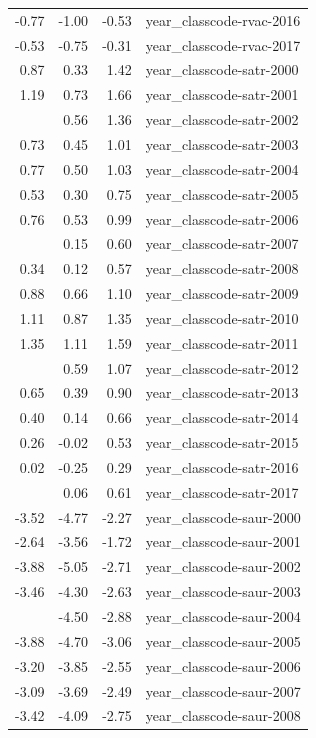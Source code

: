 \documentclass[]{article}
\begin{document}
\begin{longtable}[t]{rrrl}
-0.77 & -1.00 & -0.53 & year\_classcode-rvac-2016\\
-0.53 & -0.75 & -0.31 & year\_classcode-rvac-2017\\
0.87 & 0.33 & 1.42 & year\_classcode-satr-2000\\
1.19 & 0.73 & 1.66 & year\_classcode-satr-2001\\
\addlinespace
0.96 & 0.56 & 1.36 & year\_classcode-satr-2002\\
0.73 & 0.45 & 1.01 & year\_classcode-satr-2003\\
0.77 & 0.50 & 1.03 & year\_classcode-satr-2004\\
0.53 & 0.30 & 0.75 & year\_classcode-satr-2005\\
0.76 & 0.53 & 0.99 & year\_classcode-satr-2006\\
\addlinespace
0.38 & 0.15 & 0.60 & year\_classcode-satr-2007\\
0.34 & 0.12 & 0.57 & year\_classcode-satr-2008\\
0.88 & 0.66 & 1.10 & year\_classcode-satr-2009\\
1.11 & 0.87 & 1.35 & year\_classcode-satr-2010\\
1.35 & 1.11 & 1.59 & year\_classcode-satr-2011\\
\addlinespace
0.83 & 0.59 & 1.07 & year\_classcode-satr-2012\\
0.65 & 0.39 & 0.90 & year\_classcode-satr-2013\\
0.40 & 0.14 & 0.66 & year\_classcode-satr-2014\\
0.26 & -0.02 & 0.53 & year\_classcode-satr-2015\\
0.02 & -0.25 & 0.29 & year\_classcode-satr-2016\\
\addlinespace
0.33 & 0.06 & 0.61 & year\_classcode-satr-2017\\
-3.52 & -4.77 & -2.27 & year\_classcode-saur-2000\\
-2.64 & -3.56 & -1.72 & year\_classcode-saur-2001\\
-3.88 & -5.05 & -2.71 & year\_classcode-saur-2002\\
-3.46 & -4.30 & -2.63 & year\_classcode-saur-2003\\
\addlinespace
-3.69 & -4.50 & -2.88 & year\_classcode-saur-2004\\
-3.88 & -4.70 & -3.06 & year\_classcode-saur-2005\\
-3.20 & -3.85 & -2.55 & year\_classcode-saur-2006\\
-3.09 & -3.69 & -2.49 & year\_classcode-saur-2007\\
-3.42 & -4.09 & -2.75 & year\_classcode-saur-2008\\

\end{longtable}
\end{document}
